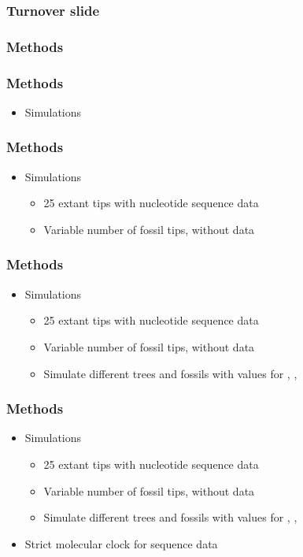 \documentclass[]{beamer}
\begin{document}
\begin{frame}
\frametitle{Turnover slide}
\end{frame}

\begin{frame}
\frametitle{Methods}
\end{frame}

\begin{frame}
\frametitle{Methods}
\begin{itemize}
\item Simulations
\end{itemize}
\end{frame}

\begin{frame}
\frametitle{Methods}
\begin{itemize}
\item Simulations
\begin{itemize}
\item 25 extant tips with nucleotide sequence data
\item Variable number of fossil tips, without data
\end{itemize}
\end{itemize}
\end{frame}

\begin{frame}
\frametitle{Methods}
\begin{itemize}
\item Simulations
\begin{itemize}
\item 25 extant tips with nucleotide sequence data
\item Variable number of fossil tips, without data
\item Simulate different trees and fossils with values for \lambda, \mu ,  \psi
\end{itemize}
\end{itemize}
\end{frame}

\begin{frame}
\frametitle{Methods}
\begin{itemize}
\item Simulations
\begin{itemize}
\item 25 extant tips with nucleotide sequence data
\item Variable number of fossil tips, without data
\item Simulate different trees and fossils with values for \lambda, \mu ,  \psi
\end{itemize}
\item Strict molecular clock for sequence data
\end{itemize}
\end{frame}
\end{document}
